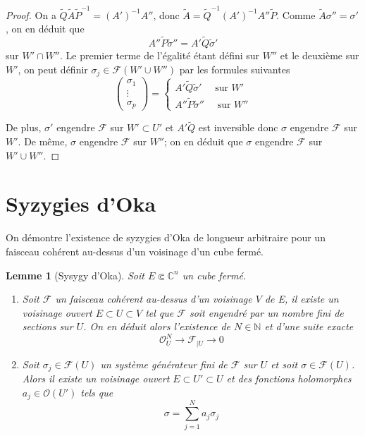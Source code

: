 \documentclass{article}
\newtheorem{lemme}[theoreme]{Lemme}
\theoremstyle{definition}
\theoremstyle{remarque}
\begin{document}
\begin{proof}
On a $\tilde{Q}\tilde{A}\tilde{P}^{-1} = (A')^{-1}A''$, donc $\tilde{A} = \tilde{Q}^{-1}(A')^{-1}A''\tilde{P}$. Comme $\tilde{A}\sigma'' = \sigma'$, on en déduit que $$A''\tilde{P}\tilde{\sigma}''=A'\tilde{Q}\tilde{\sigma}'$$ sur $W' \cap W''$. Le premier terme de l'égalité étant défini sur $W''$ et le deuxième sur $W'$, on peut définir $\sigma_j \in \mathcal{F}(W'\cup W'')$ par les formules suivantes
\begin{equation*}
\begin{pmatrix}
   \sigma_1 \\ \vdots \\ \sigma_p
\end{pmatrix} = \left\{
\begin{array}{l}
  A'\tilde{Q}\tilde{\sigma}' \quad\text{ sur } W'\\
  A''\tilde{P}\tilde{\sigma}'' \quad\text{ sur } W''
\end{array}
\right.
\end{equation*}

De plus, $\sigma'$ engendre $\mathcal{F}$ sur $W' \subset U'$ et $A'\tilde{Q}$ est inversible donc $\sigma$ engendre $\mathcal{F}$ sur $W'$. De même, $\sigma$ engendre $\mathcal{F}$ sur $W''$; on en déduit que $\sigma$ engendre $\mathcal{F}$ sur $W'\cup W''$.
\end{proof}

\section{Syzygies d'Oka}

On démontre l'existence de syzygies d'Oka de longueur arbitraire pour un faisceau cohérent au-dessus d'un voisinage d'un cube fermé.

\begin{lemme}[Sysygy d'Oka]
Soit $E \Subset \mathbb{C}^n$ un cube fermé.
\begin{enumerate}
\item Soit $\mathcal{F}$ un faisceau cohérent au-dessus d'un voisinage $V$ de E, il existe un voisinage ouvert $E \subset U \subset V$ tel que $\mathcal{F}$ soit engendré par un nombre fini de sections sur $U$. On en déduit alors l'existence de $N \in \mathbb{N}$ et d'une suite exacte $$\mathcal{O}^N_U \to \mathcal{F}_{|U} \to 0$$
\item Soit $\sigma_j \in \mathcal{F}(U)$ un système générateur fini de $\mathcal{F}$ sur $U$ et  soit $\sigma \in \mathcal{F}(U)$. Alors il existe un voisinage ouvert $E \subset U' \subset U$ et des fonctions holomorphes $a_j \in \mathcal{O}(U')$ tels que $$\sigma = \sum_{j=1}^N a_j\sigma_j$$
\end{enumerate}
\end{lemme}
\end{document}
